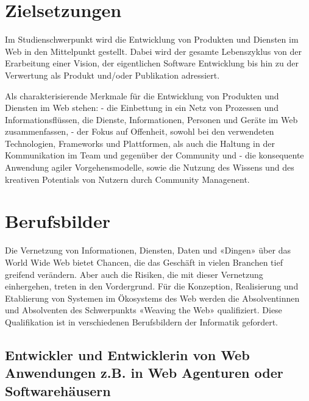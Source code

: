 \section*{Zielsetzungen\label{/mi-2017/modulbeschreibungen-master/schwerpunkt-weaving-the-web}}\label{zielsetzungenpathlabelmi-2017modulbeschreibungen-masterschwerpunkt-weaving-the-web}

Im Studienschwerpunkt wird die Entwicklung von Produkten und Diensten im
Web in den Mittelpunkt gestellt. Dabei wird der gesamte Lebenszyklus von
der Erarbeitung einer Vision, der eigentlichen Software Entwicklung bis
hin zu der Verwertung als Produkt und/oder Publikation adressiert.

Als charakterisierende Merkmale für die Entwicklung von Produkten und
Diensten im Web stehen: - die Einbettung in ein Netz von Prozessen und
Informationsflüssen, die Dienste, Informationen, Personen und Geräte im
Web zusammenfassen, - der Fokus auf Offenheit, sowohl bei den
verwendeten Technologien, Frameworks und Plattformen, als auch die
Haltung in der Kommunikation im Team und gegenüber der Community und -
die konsequente Anwendung agiler Vorgehensmodelle, sowie die Nutzung des
Wissens und des kreativen Potentials von Nutzern durch Community
Managenent.

\section*{Berufsbilder\label{/mi-2017/modulbeschreibungen-master/schwerpunkt-weaving-the-web}}\label{berufsbilderpathlabelmi-2017modulbeschreibungen-masterschwerpunkt-weaving-the-web}

Die Vernetzung von Informationen, Diensten, Daten und «Dingen» über das
World Wide Web bietet Chancen, die das Geschäft in vielen Branchen tief
greifend verändern. Aber auch die Risiken, die mit dieser Vernetzung
einhergehen, treten in den Vordergrund. Für die Konzeption, Realisierung
und Etablierung von Systemen im Ökosystems des Web werden die
Absolventinnen und Absolventen des Schwerpunkts «Weaving the Web»
qualifiziert. Diese Qualifikation ist in verschiedenen Berufsbildern der
Informatik gefordert.

\subsection*{Entwickler und Entwicklerin von Web Anwendungen z.B. in
Web Agenturen oder
Softwarehäusern\label{/mi-2017/modulbeschreibungen-master/schwerpunkt-weaving-the-web}}\label{entwickler-und-entwicklerin-von-web-anwendungen-z.b.-in-web-agenturen-oder-softwarehuxe4usernpathlabelmi-2017modulbeschreibungen-masterschwerpunkt-weaving-the-web}

